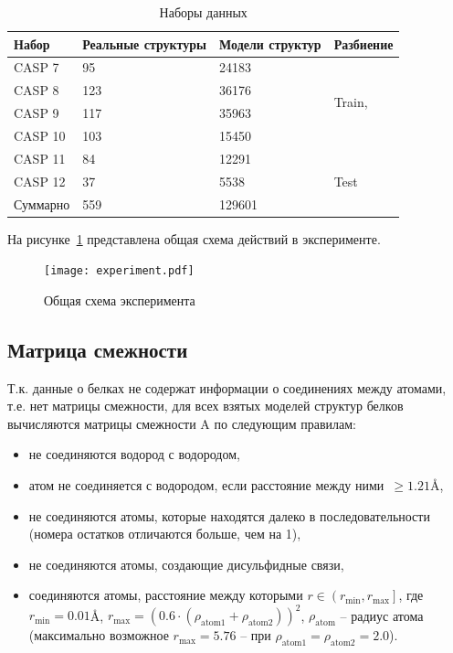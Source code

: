 \documentclass[14pt]{extarticle}
\begin{document}
\begin{table}[H]
		\centering
		\begin{tabular}{p{28mm}|p{26mm}p{26mm}|p{28mm}}
		\hline Набор & Реальные структуры & Модели структур& Разбиение\\
		\hline 
		CASP 7 & 95 & 24183 & \\
		CASP 8 & 123 & 36176 &  \multirow{2}{*}{Train,} \\
		CASP 9 & 117 & 35963 &  \multirow{2}{*}{Validation}\\
		CASP 10 & 103 & 15450 & \\
		CASP 11 & 84 & 12291 &  \\
		\hline 
		CASP 12 & 37 & 5538 & {Test} \\
		\hline
		Суммарно & 559 & 129601 &
		\end{tabular}
		\caption{Наборы данных}
		\label{table:student}
\end{table}

На рисунке~\ref{fig:experiment} представлена общая схема действий в эксперименте.

\begin{figure}[h]
	\centering
	\texttt{[image: experiment.pdf]}
	\caption{Общая схема эксперимента}
	\label{fig:experiment}
\end{figure}

\subsection{Матрица смежности}
Т.к. данные о белках не содержат информации о соединениях между атомами, т.е. нет матрицы смежности, для всех взятых моделей структур белков вычисляются матрицы смежности A по следующим правилам:
\begin{itemize}
	\item не соединяются водород с водородом,
	\item атом не соединяется с водородом, если расстояние между ними~$\geq 1.21$\AA,
	\item не соединяются атомы, которые находятся далеко в последовательности (номера остатков отличаются больше, чем на 1),
	\item не соединяются атомы, создающие дисульфидные связи,
	\item соединяются атомы, расстояние между которыми $r\in \left(r_\text{min}, r_\text{max}\right]$, где $r_\text{min} = 0.01$\AA, $r_\text{max} = \left(0.6\cdot(\rho_\text{atom1}+\rho_\text{atom2})\right)^2$, $\rho_\text{atom}$ -- радиус атома (максимально возможное $r_\text{max} = 5.76$ -- при $\rho_\text{atom1} = \rho_\text{atom2} = 2.0$).
\end{itemize}
\end{document}
